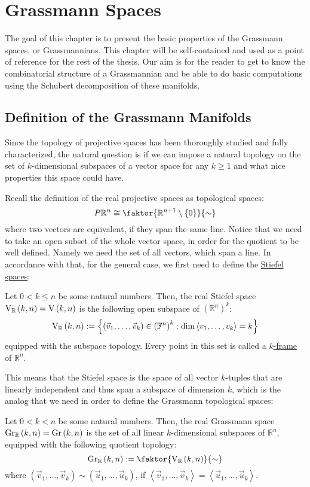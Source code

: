 \chapter{Grassmann Spaces}
The goal of this chapter is to present the basic properties of the Grassmann spaces, or Grassmannians. This chapter will be self-contained and used as a point of reference for the rest of the thesis. Our aim is for the reader to get to know the combinatorial structure of a Grassmannian and be able to do basic computations using the Schubert decomposition of these manifolds. 

\section{Definition of the Grassmann Manifolds}
Since the topology of projective spaces has been thoroughly studied and fully characterized, the natural question is if we can impose a natural topology on the set of $k$-dimensional subspaces of a vector space for any $k\geq1$ and what nice properties this space could have.

Recall the definition of the real projective spaces as topological spaces:
$$P\mathbb{R}^n\cong\faktor{\mathbb{R}^{n+1}\setminus\{0\}}{\sim}$$
where two vectors are equivalent, if they span the same line. Notice that we need to take an open subset of the whole vector space, in order for the quotient to be well defined. Namely we need the set of all vectors, which span a line. In accordance with that, for the general case, we first need to define the \ul{Stiefel spaces}:

\begin{definition} Let $0<k\leq n$ be some natural numbers. Then, the real Stiefel space $\St{k}{n}{\mathbb{R}}=\St{k}{n}$ is the following open subspace of $\left(\mathbb{R}^n\right)^k$:
$$\St{k}{n}{\mathbb{R}}:=\left\{\left(\vec{v}_1,\ldots,\vec{v}_k\right)\in\left(\mathbb{F}^n\right)^k:\dim\left<v_1,\ldots,v_k\right>=k\right\}$$
equipped with the subspace topology. Every point in this set is called a \ul{$k$-frame} of $\mathbb{R}^n$.
\end{definition}

This means that the Stiefel space is the space of all vector $k$-tuples that are linearly independent and thus span a subspace of dimension $k$, which is the analog that we need in order to define the Grassmann topological spaces:

\begin{definition} Let $0<k<n$ be some natural numbers. Then, the real Grassmann space $\Gr{k}{n}{\mathbb{R}}=\Gr{k}{n}$ is the set of all linear $k$-dimensional subspaces of $\mathbb{R}^n$, equipped with the following quotient topology:
$$\Gr{k}{n}{\mathbb{R}}:=\faktor{\St{k}{n}{\mathbb{R}}}{\sim}$$
where $(\vec{v}_1,\ldots,\vec{v}_k)\sim(\vec{u}_1,\ldots,\vec{u}_k)$, if $\left<\vec{v}_1,\ldots,\vec{v}_k\right>=\left<\vec{u}_1,\ldots,\vec{u}_k\right>$.
\end{definition}

